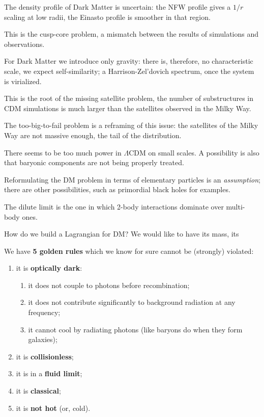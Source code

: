 \documentclass[main.tex]{subfiles}
\begin{document}

The density profile of Dark Matter is uncertain: 
the NFW profile gives a \(1/r\) scaling at low radii, the Einasto profile 
is smoother in that region. 

This is the cusp-core problem, a mismatch between the results of simulations
and observations. 

For Dark Matter we introduce only gravity: there is, therefore, no characteristic 
scale, we expect self-similarity; a Harrison-Zel'dovich spectrum, once the 
system is virialized. 

This is the root of the missing satellite problem, 
the number of substructures in CDM simulations
is much larger than the satellites observed in the Milky Way. 

The too-big-to-fail problem is a reframing of this issue: the 
satellites of the Milky Way are not massive enough, the tail of the 
distribution. 

There seems to be too much power in \(\Lambda \)CDM on small scales. 
A possibility is also that baryonic components are not being properly treated. 

Reformulating the DM problem in terms of elementary particles is an \emph{assumption}; 
there are other possibilities, such as primordial black holes for examples. 

The dilute limit is the one in which 2-body interactions dominate over multi-body 
ones. 

How do we build a Lagrangian for DM? We would like to have its mass, its 

We have \textbf{5 golden rules} which we know for sure cannot be (strongly) violated: 
\begin{enumerate}
    \item it is \textbf{optically dark}:
    \begin{enumerate}    
        \item it does not couple to photons before recombination;
        \item it does not contribute significantly to background radiation at any frequency;
        \item it cannot cool by radiating photons (like baryons do when they form galaxies);
    \end{enumerate}
    \item it is \textbf{collisionless};
    \item it is in a \textbf{fluid limit}; 
    \item it is \textbf{classical};
    \item it is \textbf{not hot} (or, cold).
\end{enumerate}
\end{document}
